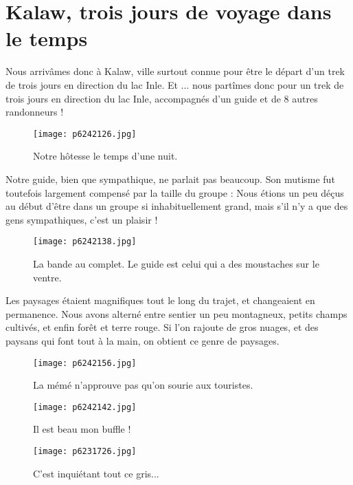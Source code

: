 \documentclass{book}
\begin{document}
\chapter{Kalaw, trois jours de voyage dans le temps}
Nous arrivâmes donc à Kalaw, ville surtout connue pour être le départ d'un trek de trois jours en direction du lac Inle. Et ... nous partîmes donc pour un trek de trois jours en direction du lac Inle, accompagnés d'un guide et de 8 autres randonneurs !


\begin{figure}[h]
\centering
\texttt{[image: p6242126.jpg]}
\caption*{Notre hôtesse le temps d'une nuit.}
\end{figure}

Notre guide, bien que sympathique, ne parlait pas beaucoup. Son mutisme fut toutefois largement compensé par la taille du groupe : Nous étions un peu déçus au début d'être dans un groupe si inhabituellement grand, mais s'il n'y a que des gens sympathiques, c'est un plaisir !




\begin{figure}[h]
\centering
\texttt{[image: p6242138.jpg]}
\caption*{La bande au complet. Le guide est celui qui a des moustaches sur le ventre.}
\end{figure}

Les paysages étaient magnifiques tout le long du trajet, et changeaient en permanence. Nous avons alterné entre sentier un peu montagneux, petits champs cultivés, et enfin forêt et terre rouge. Si l'on rajoute de gros nuages, et des paysans qui font tout à la main, on obtient ce genre de paysages.




\begin{figure}[h]
\centering
\texttt{[image: p6242156.jpg]}
\caption*{La mémé n'approuve pas qu'on sourie aux touristes.}
\end{figure}


\begin{figure}[h]
\centering
\texttt{[image: p6242142.jpg]}
\caption*{Il est beau mon buffle !}
\end{figure}


\begin{figure}[h]
\centering
\texttt{[image: p6231726.jpg]}
\caption*{C'est inquiétant tout ce gris...}
\end{figure}
\end{document}

